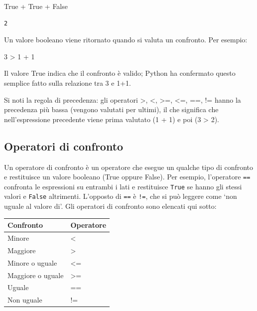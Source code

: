 \documentclass[
  letterpaper,
  krantz2]{{[}./krantz{]}}
\newenvironment{Shaded}{\begin{snugshade}}{\end{snugshade}}
\newcommand{\DecValTok}[1]{\textcolor[rgb]{0.68,0.00,0.00}{#1}}
\newcommand{\OperatorTok}[1]{\textcolor[rgb]{0.37,0.37,0.37}{#1}}
\newcommand{\VariableTok}[1]{\textcolor[rgb]{0.07,0.07,0.07}{#1}}
\begin{document}
\begin{Shaded}
\begin{Highlighting}[]
\VariableTok{True} \OperatorTok{+} \VariableTok{True} \OperatorTok{+} \VariableTok{False}
\end{Highlighting}
\end{Shaded}

\begin{verbatim}
2
\end{verbatim}

Un valore booleano viene ritornato quando si valuta un confronto. Per
esempio:

\begin{Shaded}
\begin{Highlighting}[]
\DecValTok{3} \OperatorTok{\textgreater{}} \DecValTok{1} \OperatorTok{+} \DecValTok{1}
\end{Highlighting}
\end{Shaded}

Il valore True indica che il confronto è valido; Python ha confermato
questo semplice fatto sulla relazione tra 3 e 1+1.

Si noti la regola di precedenza: gli operatori \textgreater, \textless,
\textgreater=, \textless=, ==, != hanno la precedenza più bassa (vengono
valutati per ultimi), il che significa che nell'espressione precedente
viene prima valutato (1 + 1) e poi (3 \textgreater{} 2).

\subsection{Operatori di confronto}\label{operatori-di-confronto}

Un operatore di confronto è un operatore che esegue un qualche tipo di
confronto e restituisce un valore booleano (True oppure False). Per
esempio, l'operatore \texttt{==} confronta le espressioni su entrambi i
lati e restituisce \texttt{True} se hanno gli stessi valori e
\texttt{False} altrimenti. L'opposto di \texttt{==} è \texttt{!=}, che
si può leggere come `non uguale al valore di'. Gli operatori di
confronto sono elencati qui sotto:

\begin{longtable}[]{@{}ll@{}}
\toprule\noalign{}
Confronto & Operatore \\
\midrule\noalign{}
\endhead
\bottomrule\noalign{}
\endlastfoot
Minore & \textless{} \\
Maggiore & \textgreater{} \\
Minore o uguale & \textless= \\
Maggiore o uguale & \textgreater= \\
Uguale & == \\
Non uguale & != \\
\end{longtable}
\end{document}
